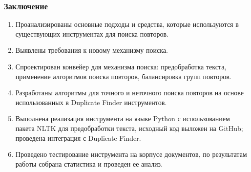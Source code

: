 \documentclass[aspectratio=169]{beamer}
\begin{document}
\begin{frame}\frametitle{Заключение}
	
\begin{enumerate}
	\item Проанализированы основные подходы и средства, которые используются в существующих инструментах для поиска повторов.
	\item Выявлены требования к новому механизму поиска.
	\item Спроектирован конвейер для механизма поиска: предобработка текста, применение алгоритмов поиска повторов, балансировка групп повторов.
	\item Разработаны алгоритмы для точного и неточного поиска повторов на основе использованных в Duplicate Finder инструментов.
	\item Выполнена реализация инструмента на языке Python с использованием пакета NLTK для предобработки текста, исходный код выложен на GitHub; проведена интеграция с Duplicate Finder.
	\item Проведено тестирование инструмента на корпусе документов, по результатам работы собрана статистика и проведен ее анализ.
\end{enumerate}

\end{frame}

\end{document}
